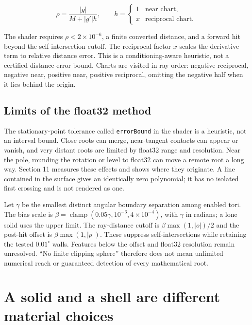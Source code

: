 \documentclass[11pt,a4paper]{article}
\begin{document}
\[
\rho=\frac{|g|}{M+|g'|h},\qquad
h=\begin{cases}1&\text{near chart},\\x&\text{reciprocal chart}.\end{cases}
\]

The shader requires \(\rho<2\times10^{-6}\), a finite converted
distance, and a forward hit beyond the self-intersection cutoff. The
reciprocal factor \(x\) scales the derivative term to relative distance
error. This is a conditioning-aware heuristic, not a certified
distance-error bound. Charts are visited in ray order: negative
reciprocal, negative near, positive near, positive reciprocal, omitting
the negative half when it lies behind the origin.

\subsection{Limits of the float32
method}\label{limits-of-the-float32-method}

The stationary-point tolerance called \texttt{errorBound} in the shader
is a heuristic, not an interval bound. Close roots can merge,
near-tangent contacts can appear or vanish, and very distant roots are
limited by float32 range and resolution. Near the pole, rounding the
rotation or level to float32 can move a remote root a long way. Section
11 measures these effects and shows where they originate. A line
contained in the surface gives an identically zero polynomial; it has no
isolated first crossing and is not rendered as one.

Let \(\gamma\) be the smallest distinct angular boundary separation
among enabled tori. The bias scale is
\(\beta=\operatorname{clamp}(0.05\gamma,10^{-6},4\times10^{-4})\), with
\(\gamma\) in radians; a lone solid uses the upper limit. The
ray-distance cutoff is \(\beta\max(1,|o|)/2\) and the post-hit offset is
\(\beta\max(1,|p|)\). These suppress self-intersections while retaining
the tested \(0.01^\circ\) walls. Features below the offset and float32
resolution remain unresolved. ``No finite clipping sphere'' therefore
does not mean unlimited numerical reach or guaranteed detection of every
mathematical root.

\section{A solid and a shell are different material
choices}\label{a-solid-and-a-shell-are-different-material-choices}
\end{document}
